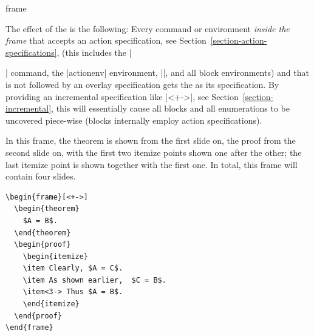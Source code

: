 \begin{environment}{{frame}}
\begin{frame}[<+->][plain]
\begin{frame}[plain]
  The effect of the  is the following: Every command or environment \emph{inside the frame} that accepts an action specification, see Section~\ref{section-action-specifications}, (this includes the |\item| command, the |actionenv| environment, |\action|, and all block environments) and that is not followed by an overlay specification gets the  as its specification. By providing an incremental specification like |<+->|, see Section~\ref{section-incremental}, this will essentially cause all blocks and all enumerations to be uncovered piece-wise (blocks internally employ action specifications).

  \example
  In this frame, the theorem is shown from the first slide on, the proof from the second slide on, with the first two itemize points shown one after the other; the last itemize point is shown together with the first one. In total, this frame will contain four slides.

\begin{verbatim}
\begin{frame}[<+->]
  \begin{theorem}
    $A = B$.
  \end{theorem}
  \begin{proof}
    \begin{itemize}
    \item Clearly, $A = C$.
    \item As shown earlier,  $C = B$.
    \item<3-> Thus $A = B$.
    \end{itemize}
  \end{proof}
\end{frame}
\end{verbatim}


\end{frame}
\end{frame}
\end{environment}

